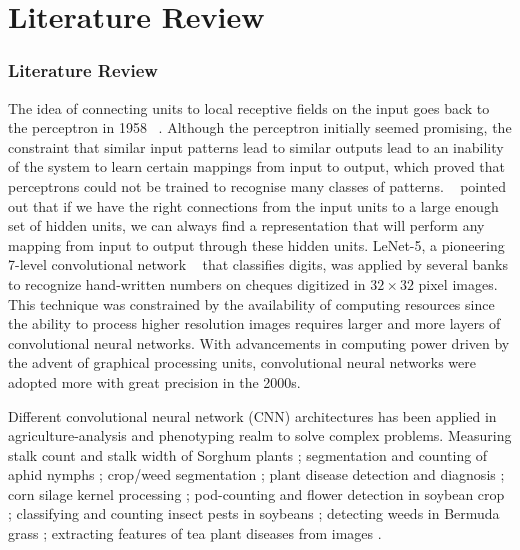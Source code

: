 \documentclass{beamer}
\begin{document}
\section{Literature Review}
\begin{frame}[allowframebreaks]
\frametitle{Literature Review}
The idea of connecting units to local receptive fields on the input goes back to the perceptron in 1958 {~\cite{Rosenblatt58theperceptron}}. Although the perceptron initially seemed promising, the constraint that similar input patterns lead to similar outputs lead to an inability of the system to learn certain mappings from input to output, which proved that perceptrons could not be trained to recognise many classes of patterns. {~\cite{MinskyPapert:69}} pointed out that if we have the right connections from the input units to a large enough set of hidden units, we can always find a representation that will perform any mapping from input to output through these hidden units. LeNet-5, a pioneering 7-level convolutional network {~\cite{lecun-gradientbased-learning-applied-1998}} that classifies digits, was applied by several banks to recognize hand-written numbers on  cheques digitized in $32\times 32$ pixel images. This technique was constrained by the availability of computing resources since the ability to process higher resolution images requires larger and more layers of convolutional neural networks. With advancements in computing power driven by the advent of graphical processing units, convolutional neural networks were adopted more with great precision in the 2000s.
 
Different convolutional neural network (CNN) architectures has been applied in agriculture-analysis and phenotyping realm to solve complex problems. Measuring stalk count and stalk width of Sorghum plants {\cite{10.1007/978-3-319-67361-5_18}}; segmentation and counting of aphid nymphs {\cite{chen2018automatic}}; crop/weed segmentation {\cite{sa2018weedmap}}; plant disease detection and diagnosis {\cite{ferentinos2018deep}}; corn silage kernel processing {\cite{rasmussen2019maize}}; pod-counting and flower detection in soybean crop {\cite{zhang2019deep}}; classifying and counting insect pests in soybeans {\cite{tetila2019deep}};  detecting weeds in Bermuda grass {\cite{yu2019deep}}; extracting features of tea plant diseases from images {\cite{chen2019visual}}.
\end{frame}

\end{document}
